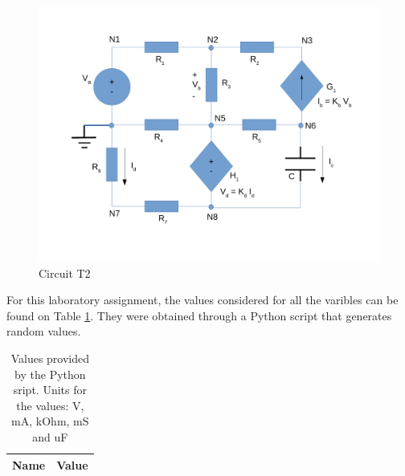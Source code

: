 \begin{figure}[ht]
	\centering
	\includegraphics[width=0.75\linewidth]{dsnh_t2.pdf}
	\caption{Circuit T2}
\label{fig:Desenho_t2}
\end{figure}



For this laboratory assignment, the values considered for all the varibles can be
found on Table \ref{tab:given_vls}. They were obtained through a Python script that
generates random values. 

\begin{table}[ht]
	\centering
	\begin{tabular}{|l|r|}
		\hline    
		{\bf Name} & {\bf Value} \\ \hline
    		
	\end{tabular}
	
	\caption{Values provided by the Python sript. Units for the values: V, mA, kOhm, mS and uF}
    
\label{tab:given_vls}
\end{table}


